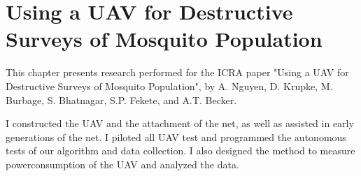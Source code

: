 \chapter[UAV Surveying Mosquitoes]{Using a UAV for Destructive Surveys of Mosquito Population}

This chapter presents research performed for the ICRA paper "Using a UAV for Destructive Surveys of Mosquito Population", by A. Nguyen, D. Krupke, M. Burbage, S. Bhatnagar, S.P. Fekete, and A.T. Becker.

I constructed the UAV and the attachment of the net, as well as assisted in early generations of the net. I piloted all UAV test and programmed the autonomous tests of our algorithm and data collection. I also designed the method to measure powerconsumption of the UAV and analyzed the data.








